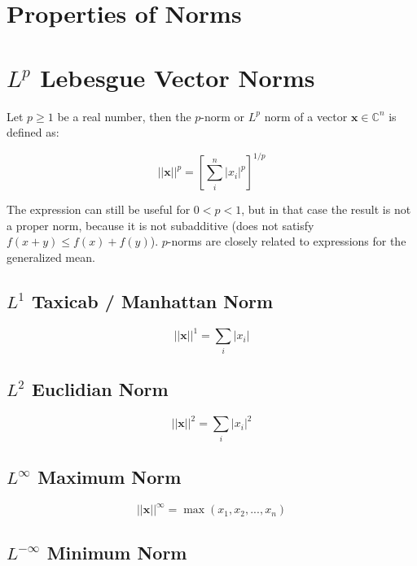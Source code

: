 \section{Properties of Norms}

\section{$L^p$ Lebesgue Vector Norms}
\label{lpnorms}

Let $p\geq1$ be a real number, then the $p$-norm or $L^p$ norm of a vector $\mathbf{x}\in\mathbb{C}^n$ is defined as:

\begin{equation}
||\mathbf{x}||^p = \left[ \sum^n_i |x_i|^p \right]^{1/p}
\end{equation}

The expression can still be useful for $0<p<1$, but in that case the result is not a proper norm, because it is not subadditive (does not satisfy $f(x+y) \leq f(x) + f(y)$). $p$-norms are closely related to expressions for the generalized mean.


\subsection{$L^{1}$ Taxicab / Manhattan Norm}
\begin{equation}
||\mathbf{x}||^1 = \sum_i |x_i|
\end{equation}


\subsection{$L^{2}$ Euclidian Norm}
\begin{equation}
||\mathbf{x}||^2 = \sum_i |x_i|^2
\end{equation}

\subsection{$L^{\infty}$ Maximum Norm} 

\begin{equation}
||\mathbf{x}||^{\infty} = \max(x_1,x_2,...,x_n)
\end{equation}

\subsection{$L^{-\infty}$ Minimum Norm} 

